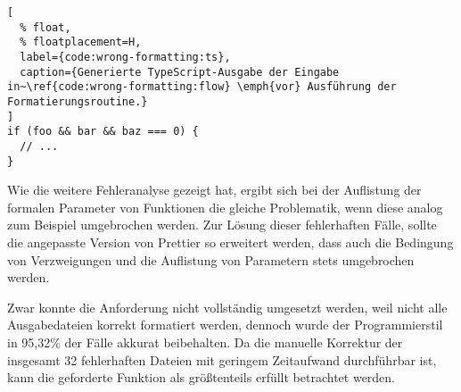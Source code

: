 \begin{lstlisting}[
  % float,
  % floatplacement=H,
  label={code:wrong-formatting:ts},
  caption={Generierte TypeScript-Ausgabe der Eingabe in~\ref{code:wrong-formatting:flow} \emph{vor} Ausführung der Formatierungsroutine.}
]
if (foo && bar && baz === 0) {
  // ...
}
\end{lstlisting}

Wie die weitere Fehleranalyse gezeigt hat, ergibt sich bei der Auflistung der formalen Parameter von Funktionen die gleiche Problematik, wenn diese analog zum Beispiel umgebrochen werden. Zur Lösung dieser fehlerhaften Fälle, sollte die angepasste Version von Prettier so erweitert werden, dass auch die Bedingung von Verzweigungen und die Auflistung von Parametern stets umgebrochen werden.

Zwar konnte die Anforderung nicht vollständig umgesetzt werden, weil nicht alle Ausgabedateien korrekt formatiert werden, dennoch wurde der Programmierstil in 95,32\% der Fälle akkurat beibehalten. Da die manuelle Korrektur der insgesamt 32 fehlerhaften Dateien mit geringem Zeitaufwand durchführbar ist, kann die geforderte Funktion als größtenteils erfüllt betrachtet werden.


